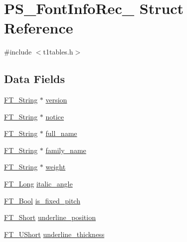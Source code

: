 \hypertarget{struct_p_s___font_info_rec__}{}\section{P\+S\+\_\+\+Font\+Info\+Rec\+\_\+ Struct Reference}
\label{struct_p_s___font_info_rec__}


{\ttfamily \#include $<$t1tables.\+h$>$}

\subsection*{Data Fields}
\begin{DoxyCompactItemize}
\item 
\hyperlink{fttypes_8h_a9846214585359eb2ba6bbb0e6de30639}{F\+T\+\_\+\+String} $\ast$ \hyperlink{struct_p_s___font_info_rec___adb595076e50f8e7ece9446f612433cfc}{version}
\item 
\hyperlink{fttypes_8h_a9846214585359eb2ba6bbb0e6de30639}{F\+T\+\_\+\+String} $\ast$ \hyperlink{struct_p_s___font_info_rec___a63858ebce653f21d9aa2ddc61ee32b80}{notice}
\item 
\hyperlink{fttypes_8h_a9846214585359eb2ba6bbb0e6de30639}{F\+T\+\_\+\+String} $\ast$ \hyperlink{struct_p_s___font_info_rec___a039dbf76ccc1b63b03e77215cb4b430b}{full\+\_\+name}
\item 
\hyperlink{fttypes_8h_a9846214585359eb2ba6bbb0e6de30639}{F\+T\+\_\+\+String} $\ast$ \hyperlink{struct_p_s___font_info_rec___ac54d883f153a495f9a20dc043ed434cf}{family\+\_\+name}
\item 
\hyperlink{fttypes_8h_a9846214585359eb2ba6bbb0e6de30639}{F\+T\+\_\+\+String} $\ast$ \hyperlink{struct_p_s___font_info_rec___a057243ec7cf62f573fa675ccb728f4b1}{weight}
\item 
\hyperlink{fttypes_8h_a7fa72a1f0e79fb1860c5965789024d6f}{F\+T\+\_\+\+Long} \hyperlink{struct_p_s___font_info_rec___ab558a75a56fadd54dfc71dcbeec1375a}{italic\+\_\+angle}
\item 
\hyperlink{fttypes_8h_a1a832a256bb5a7e6e884afaa1a07f3ae}{F\+T\+\_\+\+Bool} \hyperlink{struct_p_s___font_info_rec___a68e2d0913fe910ea86d558a4a426412a}{is\+\_\+fixed\+\_\+pitch}
\item 
\hyperlink{fttypes_8h_aa7279be89046a2563cd3d4d6651fbdcf}{F\+T\+\_\+\+Short} \hyperlink{struct_p_s___font_info_rec___a772af52d17288d7846e8893e74d55212}{underline\+\_\+position}
\item 
\hyperlink{fttypes_8h_a937f6c17cf5ffd09086d8610c37b9f58}{F\+T\+\_\+\+U\+Short} \hyperlink{struct_p_s___font_info_rec___a423904e811db5195485557bf0dccf126}{underline\+\_\+thickness}
\end{DoxyCompactItemize}


